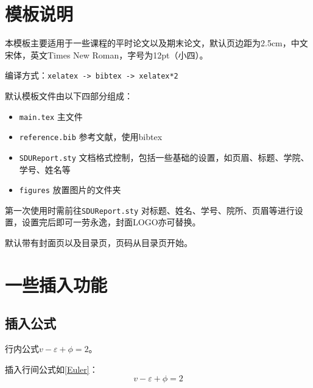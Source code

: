 \documentclass[12pt,hyperref,a4paper,UTF8]{ctexart}
\begin{document}
\cover

%
%

\thispagestyle{empty} %

\newpage
\tableofcontents

\newpage


\section{模板说明}
本模板主要适用于一些课程的平时论文以及期末论文，默认页边距为2.5cm，中文宋体，英文Times New Roman，字号为12pt（小四）。

编译方式：\verb|xelatex -> bibtex -> xelatex*2|


默认模板文件由以下四部分组成：
\begin{itemize}
    \item \texttt{main.tex} 主文件
    \item \texttt{reference.bib} 参考文献，使用bibtex
    \item \texttt{SDUReport.sty} 文档格式控制，包括一些基础的设置，如页眉、标题、学院、学号、姓名等
    \item \texttt{figures} 放置图片的文件夹
\end{itemize}

第一次使用时需前往\texttt{SDUReport.sty} 对标题、姓名、学号、院所、页眉等进行设置，设置完后即可一劳永逸，封面LOGO亦可替换。

默认带有封面页以及目录页，页码从目录页开始。

\section{一些插入功能}
\subsection{插入公式}
行内公式$v-\varepsilon+\phi=2$。

插入行间公式如\autoref{Euler}：
\begin{equation}
    v-\varepsilon+\phi=2
    \label{Euler}
\end{equation}
\end{document}
